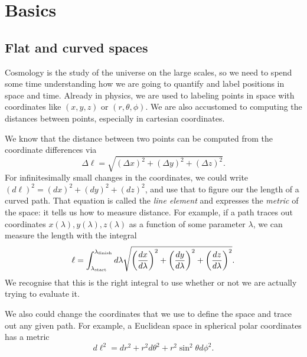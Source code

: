 \chapter{Basics}

\section{Flat and curved spaces}
Cosmology is the study of the universe on the large scales, so we need to spend some time understanding how we are going to quantify and label positions in space and time.  Already in physics, we are used to labeling points in space with coordinates like $(x,y,z)$ or $(r,\theta,\phi)$.  We are also accustomed to computing the distances between points, especially in cartesian coordinates.

We know that the distance between two points can be computed from the coordinate differences via
\begin{equation}
  \Delta \ell = \sqrt{(\Delta x)^2 + (\Delta y)^2 + (\Delta z)^2 }.
\end{equation}
For infinitesimally small changes in the coordinates, we could write $  (d\ell)^2 = (dx)^2 + (dy)^2 + (dz)^2$, and use that to figure our the length of a curved path.  That equation is called the \textit{line element} and expresses the \textit{metric} of the space: it tells us how to measure distance.  For example, if a path traces out coordinates $x(\lambda),y(\lambda),z(\lambda)$ as a function of some parameter $\lambda$, we can measure the length with the integral
\begin{equation}
   \ell = \int_{\lambda_{\rm start}}^{\lambda_{\rm finish}} d\lambda \sqrt{ \left(\frac{dx}{d\lambda} \right)^2 + \left(\frac{dy}{d\lambda}\right)^2 + \left(\frac{dz}{d\lambda}\right)^2}.
\end{equation}
We recognise that this is the right integral to use whether or not we are actually trying to evaluate it.

We also could change the coordinates that we use to define the space and trace out any given path.  For example, a Euclidean space in spherical polar coordinates has a metric
\begin{equation}
   d\ell^2 = dr^2 + r^2 d\theta^2 + r^2 \sin^2 \theta d\phi^2.
\end{equation}

